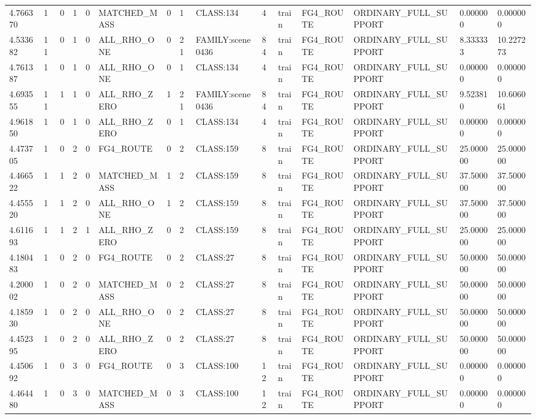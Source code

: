 \begin{tabular}{lllllllllllllll}
4.766370 & 1 & 0 & 1 & 0 & MATCHED\_MASS & 0 & 1 & CLASS:134 & 4 & train & FG4\_ROUTE & ORDINARY\_FULL\_SUPPORT & 0.000000 & 0.000000 \\
4.533682 & 11 & 0 & 1 & 0 & ALL\_RHO\_ONE & 0 & 21 & FAMILY:scene0436 & 84 & train & FG4\_ROUTE & ORDINARY\_FULL\_SUPPORT & 8.333333 & 10.227273 \\
4.761387 & 1 & 0 & 1 & 0 & ALL\_RHO\_ONE & 0 & 1 & CLASS:134 & 4 & train & FG4\_ROUTE & ORDINARY\_FULL\_SUPPORT & 0.000000 & 0.000000 \\
4.693555 & 11 & 1 & 1 & 0 & ALL\_RHO\_ZERO & 1 & 21 & FAMILY:scene0436 & 84 & train & FG4\_ROUTE & ORDINARY\_FULL\_SUPPORT & 9.523810 & 10.606061 \\
4.961850 & 1 & 0 & 1 & 0 & ALL\_RHO\_ZERO & 0 & 1 & CLASS:134 & 4 & train & FG4\_ROUTE & ORDINARY\_FULL\_SUPPORT & 0.000000 & 0.000000 \\
4.473705 & 1 & 0 & 2 & 0 & FG4\_ROUTE & 0 & 2 & CLASS:159 & 8 & train & FG4\_ROUTE & ORDINARY\_FULL\_SUPPORT & 25.000000 & 25.000000 \\
4.466522 & 1 & 1 & 2 & 0 & MATCHED\_MASS & 1 & 2 & CLASS:159 & 8 & train & FG4\_ROUTE & ORDINARY\_FULL\_SUPPORT & 37.500000 & 37.500000 \\
4.455520 & 1 & 1 & 2 & 0 & ALL\_RHO\_ONE & 1 & 2 & CLASS:159 & 8 & train & FG4\_ROUTE & ORDINARY\_FULL\_SUPPORT & 37.500000 & 37.500000 \\
4.611693 & 1 & 1 & 2 & 1 & ALL\_RHO\_ZERO & 0 & 2 & CLASS:159 & 8 & train & FG4\_ROUTE & ORDINARY\_FULL\_SUPPORT & 25.000000 & 25.000000 \\
4.180483 & 1 & 0 & 2 & 0 & FG4\_ROUTE & 0 & 2 & CLASS:27 & 8 & train & FG4\_ROUTE & ORDINARY\_FULL\_SUPPORT & 50.000000 & 50.000000 \\
4.200002 & 1 & 0 & 2 & 0 & MATCHED\_MASS & 0 & 2 & CLASS:27 & 8 & train & FG4\_ROUTE & ORDINARY\_FULL\_SUPPORT & 50.000000 & 50.000000 \\
4.185930 & 1 & 0 & 2 & 0 & ALL\_RHO\_ONE & 0 & 2 & CLASS:27 & 8 & train & FG4\_ROUTE & ORDINARY\_FULL\_SUPPORT & 50.000000 & 50.000000 \\
4.452395 & 1 & 0 & 2 & 0 & ALL\_RHO\_ZERO & 0 & 2 & CLASS:27 & 8 & train & FG4\_ROUTE & ORDINARY\_FULL\_SUPPORT & 50.000000 & 50.000000 \\
4.450692 & 1 & 0 & 3 & 0 & FG4\_ROUTE & 0 & 3 & CLASS:100 & 12 & train & FG4\_ROUTE & ORDINARY\_FULL\_SUPPORT & 0.000000 & 0.000000 \\
4.464480 & 1 & 0 & 3 & 0 & MATCHED\_MASS & 0 & 3 & CLASS:100 & 12 & train & FG4\_ROUTE & ORDINARY\_FULL\_SUPPORT & 0.000000 & 0.000000 \\

\end{tabular}

